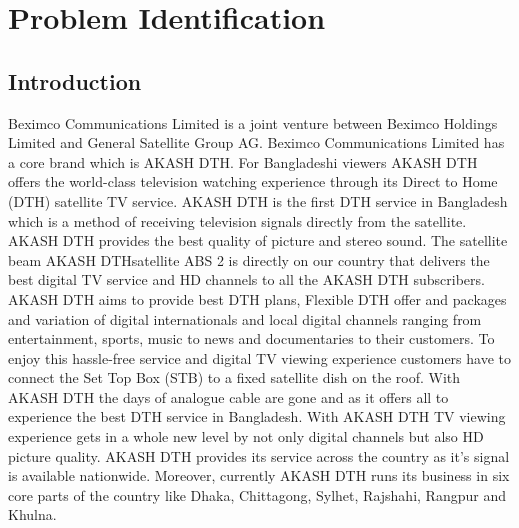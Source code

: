 \chapter{Problem Identification}
\begin{spacing}{1.0}
\setlength{\parskip}{0.3in}
\graphicspath{{./Chapter1/}}


\section{Introduction}
Beximco  Communications Limited is a joint venture between Beximco Holdings Limited and General Satellite Group AG. Beximco Communications Limited has a core brand which is AKASH DTH. For Bangladeshi viewers AKASH DTH offers the world-class television watching experience through its Direct to Home (DTH) satellite TV service. AKASH DTH is the first DTH service in Bangladesh which is a method of receiving television signals directly from the satellite. AKASH DTH provides the best quality of picture and stereo sound. The satellite beam AKASH DTHsatellite ABS 2 is directly on our country that delivers the best digital TV service and HD channels to all the AKASH DTH subscribers. AKASH DTH aims to provide best DTH plans, Flexible DTH offer and packages and variation of digital internationals and local digital channels ranging from entertainment, sports, music to news and documentaries to their customers. To enjoy this hassle-free service and digital TV viewing experience customers have to connect the Set Top Box (STB) to a fixed satellite dish on the roof. With AKASH DTH the days of analogue cable are gone and as it offers all to experience the best DTH service in Bangladesh. With AKASH DTH TV viewing experience gets in a whole new level by not only digital channels but also HD picture quality. AKASH DTH provides its service across the country as it’s signal is available nationwide. Moreover, currently AKASH DTH runs its business in six core parts of the country like Dhaka, Chittagong, Sylhet, Rajshahi, Rangpur and Khulna.

\end{spacing}
